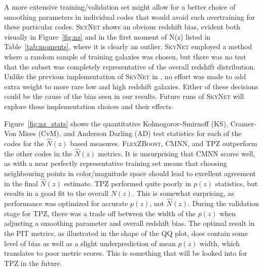 A more extensive training/validation set might allow for a better choice of smoothing parameters in individual codes that would avoid such overtraining for these particular codes.
\textsc{SkyNet} shows an obvious redshift bias, evident both visually in Figure~\ref{fig:nz} and in the first moment of N(z) listed in Table~\ref{tab:moments}, where it is clearly an outlier.  \textsc{SkyNet} employed a method where a random sample of training galaxies was chosen, but there was no test that the subset was completely representative of the overall redshift distribution.  Unlike the previous implementation of \textsc{SkyNet} in \citet{Bonnett:15}, no effort was made to add extra weight to more rare low and high redshift galaxies.  Either of these decisions could be the cause of the bias seen in our results.  Future runs of \textsc{SkyNet} will explore these implementation choices and their effects.


Figure~\ref{fig:nz_stats} shows the quantitative Kolmogorov-Smirnoff (KS), Cramer-Von Mises (CvM), and Anderson Darling (AD) test statistics for each of the codes for the $\hat{N}(z)$ based measures.
\textsc{FlexZBoost}, \textsc{CMNN}, and \textsc{TPZ} outperform the other codes in the $\hat{N}(z)$ metrics.
It is unsurprising that \textsc{CMNN} scores well, as with a near perfectly representative training set means that choosing neighbouring points in color/magnitude space should lead to excellent agreement in the final $\hat{N}(z)$ estimate.  \textsc{TPZ} performed quite poorly in $p(z)$ statistics, but results in a good fit to the overall $N(z)$.  This is somewhat surprising, as performance was optimized for accurate $p(z)$, not $\hat{N}(z)$.  During the validation stage for \textsc{TPZ}, there was a trade off between the width of the $p(z)$ when adjusting a smoothing parameter and overall redshift bias.  The optimal result in the PIT metrics, as illustrated in the shape of the QQ plot, does contain some level of bias as well as a slight underprediction of mean $p(z)$ width, which translates to poor metric scores.  This is something that will be looked into for \textsc{TPZ} in the future.

